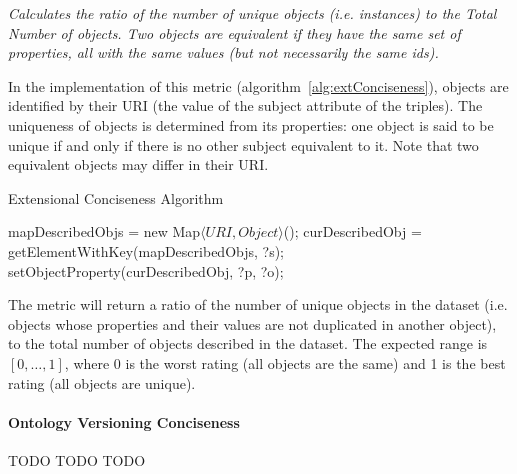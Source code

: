 \begin{mdframed}[style=metricdefinition]
\emph{Calculates the ratio of the number of unique objects (i.e. instances) to the Total Number of objects. Two objects are equivalent if they have the same set of properties, all with the same values (but not necessarily the same ids).}
\end{mdframed}

In the implementation of this metric (algorithm~\ref{alg:extConciseness}), objects are identified by their URI (the value of the subject attribute of the triples). The uniqueness of objects is determined from its properties: one object is said to be unique if and only if there is no other subject equivalent to it. Note that two equivalent objects may differ in their URI.
\begin{algorithm}
\caption{Extensional Conciseness Algorithm} \label{alg:extConciseness}
\begin{algorithmic}[1]
\State mapDescribedObjs = new Map$\langle URI, Object\rangle$();
\EndProcedure
{}
\State curDescribedObj = getElementWithKey(mapDescribedObjs, ?s);
\State setObjectProperty(curDescribedObj, ?p, ?o); ~\\
\EndProcedure
\end{algorithmic}
\end{algorithm}
The metric will return a ratio of the number of unique objects in the dataset (i.e. objects whose properties and their values are not duplicated in another object), to the total number of objects described in the dataset. The expected range is $[0,\ldots,1]$, where 0 is the worst rating (all objects are the same) and 1 is the best rating (all objects are unique).

\paragraph{Ontology Versioning Conciseness}
TODO TODO TODO